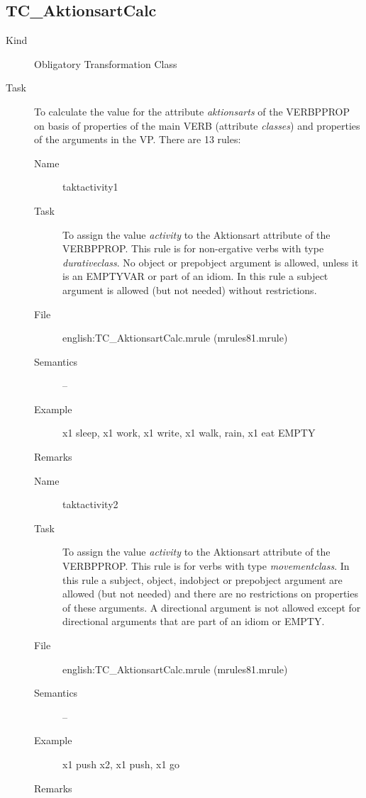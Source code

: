 \newpage
\subsection{TC\_AktionsartCalc}

\begin{description}
\item[Kind] Obligatory Transformation Class
\item[Task] To calculate the value for the attribute {\em aktionsarts\/} of the 
VERBPPROP on basis of properties of the main VERB (attribute {\em classes\/})
and properties of the arguments in the VP. There are 13 rules:

\vspace{1 cm}
\begin{description}
\item[Name] taktactivity1
\item[Task] To assign the value {\em activity\/} to the Aktionsart attribute of 
the VERBPPROP. This rule is for non-ergative verbs with type 
{\em durativeclass}. No object or prepobject argument is allowed, unless it 
is an EMPTYVAR or part of an idiom.
In this rule a subject argument is allowed (but not needed) without 
restrictions.
\item[File] english:TC\_AktionsartCalc.mrule (mrules81.mrule)
\item[Semantics] --
\item[Example] x1 sleep, x1 work, x1 write, x1 walk, rain, x1 eat EMPTY
\item[Remarks]
\end{description}

\vspace{1 cm}
\begin{description}
\item[Name] taktactivity2
\item[Task] To assign the value {\em activity\/} to the Aktionsart attribute of 
the VERBPPROP. This rule is for verbs with type {\em movementclass}.
In this rule a subject, object, indobject  or prepobject argument are
allowed (but not needed) and there are no restrictions 
on properties of these arguments. A directional argument is not allowed except 
for directional arguments that are part of an idiom or EMPTY.
\item[File] english:TC\_AktionsartCalc.mrule (mrules81.mrule)
\item[Semantics] --
\item[Example] x1 push x2, x1 push, x1 go
\item[Remarks]
\end{description}


\end{description}
